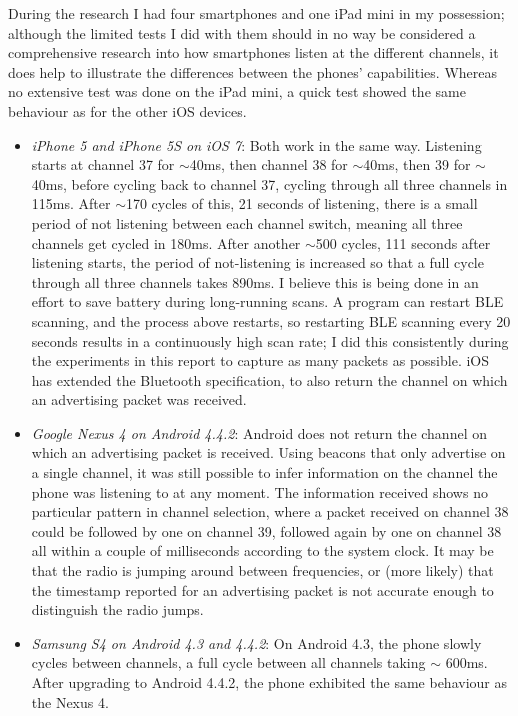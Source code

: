 During the research I had four smartphones and one iPad mini in my possession; although the limited tests I did with them should in no way be considered a comprehensive research into how smartphones listen at the different channels, it does help to illustrate the differences between the phones' capabilities.
Whereas no extensive test was done on the iPad mini, a quick test showed the same behaviour as for the other iOS devices.
\begin{itemize}
    \item \emph{iPhone 5 and iPhone 5S on iOS 7}: Both work in the same way.
        Listening starts at channel 37 for $\sim$40ms, then channel 38 for $\sim$40ms, then 39 for $\sim$40ms, before cycling back to channel 37, cycling through all three channels in 115ms.
        After $\sim$170 cycles of this, 21 seconds of listening, there is a small period of not listening between each channel switch, meaning all three channels get cycled in 180ms.
        After another $\sim$500 cycles, 111 seconds after listening starts, the period of not-listening is increased so that a full cycle through all three channels takes 890ms.
        I believe this is being done in an effort to save battery during long-running scans.
        A program can restart BLE scanning, and the process above restarts, so restarting BLE scanning every 20 seconds results in a continuously high scan rate; I did this consistently during the experiments in this report to capture as many packets as possible.
        iOS has extended the Bluetooth specification, to also return the channel on which an advertising packet was received.
    \item \emph{Google Nexus 4 on Android 4.4.2}: Android does not return the channel on which an advertising packet is received. 
        Using beacons that only advertise on a single channel, it was still possible to infer information on the channel the phone was listening to at any moment.
        The information received shows no particular pattern in channel selection, where a packet received on channel 38 could be followed by one on channel 39, followed again by one on channel 38 all within a couple of milliseconds according to the system clock.
        It may be that the radio is jumping around between frequencies, or (more likely) that the timestamp reported for an advertising packet is not accurate enough to distinguish the radio jumps.
    \item \emph{Samsung S4 on Android 4.3 and 4.4.2}: On Android 4.3, the phone slowly cycles between channels, a full cycle between all channels taking $\sim$ 600ms.
        After upgrading to Android 4.4.2, the phone exhibited the same behaviour as the Nexus 4.
\end{itemize}
        
